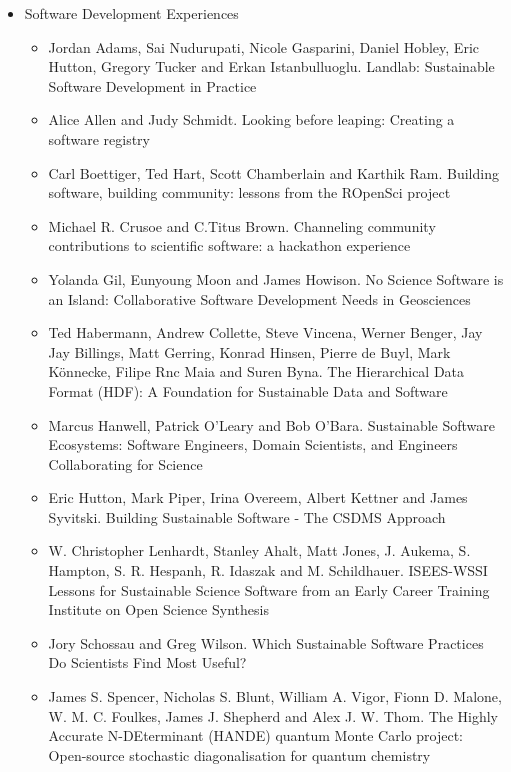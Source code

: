 \documentclass[11pt, oneside]{amsart}
\begin{document}
\begin{itemize}
\item Software Development Experiences
\begin{itemize}
\item Jordan Adams, Sai Nudurupati, Nicole Gasparini, Daniel Hobley, Eric Hutton, Gregory Tucker and Erkan Istanbulluoglu. Landlab: Sustainable Software Development in Practice ~\cite{wssspe2_adams}
\item Alice Allen and Judy Schmidt. Looking before leaping: Creating a software registry~\cite{wssspe2_allen}
\item Carl Boettiger, Ted Hart, Scott Chamberlain and Karthik Ram. Building software, building community: lessons from the {ROpenSci} project~\cite{wssspe2_boettiger}
\item Michael R. Crusoe and C.Titus Brown. Channeling community contributions to scientific software: a hackathon experience~\cite{wssspe2_crusoe}
\item Yolanda Gil,  Eunyoung Moon and James Howison. No Science Software is an Island: Collaborative Software Development Needs in Geosciences~\cite{wssspe2_gil}
\item Ted Habermann, Andrew Collette, Steve Vincena, Werner Benger, Jay Jay Billings, Matt Gerring, Konrad Hinsen, Pierre de Buyl, Mark K\"{o}nnecke, Filipe Rnc Maia and Suren Byna. The Hierarchical Data Format ({HDF}): A Foundation for Sustainable Data and Software~\cite{wssspe2_habermann}
\item Marcus Hanwell, Patrick O'Leary and Bob O'Bara. Sustainable Software Ecosystems: Software Engineers, Domain Scientists, and Engineers Collaborating for Science~\cite{wssspe2_hanwell}
\item Eric Hutton, Mark Piper, Irina Overeem, Albert Kettner and James Syvitski. Building Sustainable Software - The {CSDMS} Approach~\cite{wssspe2_hutton}
\item W. Christopher Lenhardt, Stanley Ahalt, Matt Jones, J. Aukema, S. Hampton, S. R. Hespanh, R. Idaszak and M. Schildhauer. {ISEES-WSSI} Lessons for Sustainable Science Software from an Early Career Training Institute on Open Science Synthesis~\cite{wssspe2_lenhardt}
\item Jory Schossau and Greg Wilson. Which Sustainable Software Practices Do Scientists Find Most Useful?~\cite{wssspe2_schossau}
\item James S. Spencer, Nicholas S. Blunt, William A. Vigor, Fionn D. Malone, W. M. C. Foulkes, James J. Shepherd and Alex J. W. Thom. The {H}ighly {A}ccurate {N-DE}terminant ({HANDE}) quantum {Monte Carlo} project: Open-source stochastic diagonalisation for quantum chemistry~\cite{wssspe2_spencer}
\end{itemize}


\end{itemize}
\end{document}

